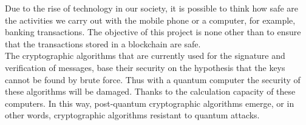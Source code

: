 


Due to the rise of technology in our society, it is possible to think how safe are the activities we carry out with the mobile phone or a computer, for example, banking transactions. The objective of this project is none other than to ensure that the transactions stored in a blockchain are safe.\\

The cryptographic algorithms that are currently used for the signature and verification of messages, base their security on the hypothesis that the keys cannot be found by brute force. Thus with a quantum computer the security of these algorithms will be damaged. Thanks to the calculation capacity of these computers. In this way, post-quantum cryptographic algorithms emerge, or in other words, cryptographic algorithms resistant to quantum attacks.\\

